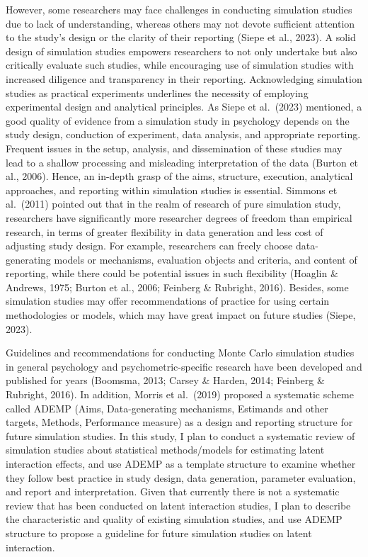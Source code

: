 \documentclass[
  man]{apa7}
\begin{document}
However, some researchers may face challenges in conducting simulation studies due to lack of understanding, whereas others may not devote sufficient attention to the study's design or the clarity of their reporting (Siepe et al., 2023). A solid design of simulation studies empowers researchers to not only undertake but also critically evaluate such studies, while encouraging use of simulation studies with increased diligence and transparency in their reporting. Acknowledging simulation studies as practical experiments underlines the necessity of employing experimental design and analytical principles. As Siepe et al.~(2023) mentioned, a good quality of evidence from a simulation study in psychology depends on the study design, conduction of experiment, data analysis, and appropriate reporting. Frequent issues in the setup, analysis, and dissemination of these studies may lead to a shallow processing and misleading interpretation of the data (Burton et al., 2006). Hence, an in-depth grasp of the aims, structure, execution, analytical approaches, and reporting within simulation studies is essential. Simmons et al.~(2011) pointed out that in the realm of research of pure simulation study, researchers have significantly more researcher degrees of freedom than empirical research, in terms of greater flexibility in data generation and less cost of adjusting study design. For example, researchers can freely choose data-generating models or mechanisms, evaluation objects and criteria, and content of reporting, while there could be potential issues in such flexibility (Hoaglin \& Andrews, 1975; Burton et al., 2006; Feinberg \& Rubright, 2016). Besides, some simulation studies may offer recommendations of practice for using certain methodologies or models, which may have great impact on future studies (Siepe, 2023).

Guidelines and recommendations for conducting Monte Carlo simulation studies in general psychology and psychometric-specific research have been developed and published for years (Boomsma, 2013; Carsey \& Harden, 2014; Feinberg \& Rubright, 2016). In addition, Morris et al.~(2019) proposed a systematic scheme called ADEMP (Aims, Data-generating mechanisms, Estimands and other targets, Methods, Performance measure) as a design and reporting structure for future simulation studies. In this study, I plan to conduct a systematic review of simulation studies about statistical methods/models for estimating latent interaction effects, and use ADEMP as a template structure to examine whether they follow best practice in study design, data generation, parameter evaluation, and report and interpretation. Given that currently there is not a systematic review that has been conducted on latent interaction studies, I plan to describe the characteristic and quality of existing simulation studies, and use ADEMP structure to propose a guideline for future simulation studies on latent interaction.
\end{document}
